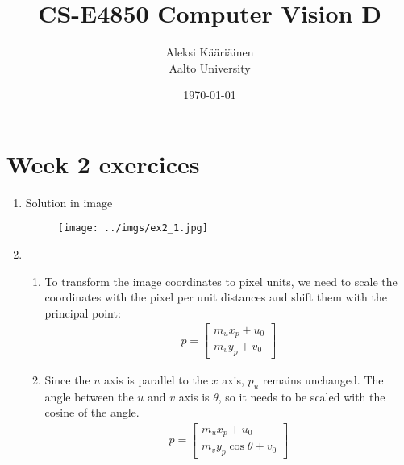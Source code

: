 \documentclass[11pt,a4paper]{article}
\title{CS-E4850 Computer Vision D}
\author{Aleksi Kääriäinen  \\
	Aalto University  \\
	}
\begin{document}
\date{\today}

\maketitle

\newpage

\section*{Week 2 exercices}

\begin{enumerate}

    \item Solution in image

          \begin{figure}[H]
              \centering
              \texttt{[image: ../imgs/ex2\_1.jpg]}
          \end{figure}

          \newpage

    \item

          \begin{enumerate}

              \item To transform the image coordinates to pixel units, we need to scale the coordinates with the
                    pixel per unit distances and shift them with the principal point:
                    \begin{align*}
                        p = \begin{bmatrix}
                                m_u x_p + u_0 \\
                                m_v y_p + v_0
                            \end{bmatrix}
                    \end{align*}

              \item Since the $u$ axis is parallel to the $x$ axis, $p_u$ remains unchanged. The angle between
                    the $u$ and $v$ axis is $\theta$, so it needs to be scaled with the cosine of the angle.
                    \begin{align*}
                        p = \begin{bmatrix}
                                m_u x_p + u_0 \\
                                m_v y_p \cos{\theta} + v_0
                            \end{bmatrix}
                    \end{align*}


\end{enumerate}
\end{enumerate}
\end{document}
